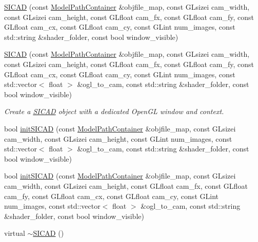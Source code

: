 \begin{DoxyCompactItemize}
\item 
\mbox{\hyperlink{classSICAD_a1d217cbdc1670f8c5885c413e4acbede}{S\+I\+C\+AD}} (const \mbox{\hyperlink{classSICAD_a9e1e1460d4c0f331b4fd015aae4dd721}{Model\+Path\+Container}} \&objfile\+\_\+map, const G\+Lsizei cam\+\_\+width, const G\+Lsizei cam\+\_\+height, const G\+Lfloat cam\+\_\+fx, const G\+Lfloat cam\+\_\+fy, const G\+Lfloat cam\+\_\+cx, const G\+Lfloat cam\+\_\+cy, const G\+Lint num\+\_\+images, const std\+::string \&shader\+\_\+folder, const bool window\+\_\+visible)
\item 
\mbox{\hyperlink{classSICAD_ac4e6349b361e3ec41d828e0d0f77f12b}{S\+I\+C\+AD}} (const \mbox{\hyperlink{classSICAD_a9e1e1460d4c0f331b4fd015aae4dd721}{Model\+Path\+Container}} \&objfile\+\_\+map, const G\+Lsizei cam\+\_\+width, const G\+Lsizei cam\+\_\+height, const G\+Lfloat cam\+\_\+fx, const G\+Lfloat cam\+\_\+fy, const G\+Lfloat cam\+\_\+cx, const G\+Lfloat cam\+\_\+cy, const G\+Lint num\+\_\+images, const std\+::vector$<$ float $>$ \&ogl\+\_\+to\+\_\+cam, const std\+::string \&shader\+\_\+folder, const bool window\+\_\+visible)
\begin{DoxyCompactList}\small\item\em Create a \mbox{\hyperlink{classSICAD}{S\+I\+C\+AD}} object with a dedicated Open\+GL window and context. \end{DoxyCompactList}\item 
bool \mbox{\hyperlink{classSICAD_a04e1291dc1a51b2dee87dbe9a5b3a316}{init\+S\+I\+C\+AD}} (const \mbox{\hyperlink{classSICAD_a9e1e1460d4c0f331b4fd015aae4dd721}{Model\+Path\+Container}} \&objfile\+\_\+map, const G\+Lsizei cam\+\_\+width, const G\+Lsizei cam\+\_\+height, const G\+Lint num\+\_\+images, const std\+::vector$<$ float $>$ \&ogl\+\_\+to\+\_\+cam, const std\+::string \&shader\+\_\+folder, const bool window\+\_\+visible)
\item 
bool \mbox{\hyperlink{classSICAD_abb2b0250a885435828d5255645e06ac8}{init\+S\+I\+C\+AD}} (const \mbox{\hyperlink{classSICAD_a9e1e1460d4c0f331b4fd015aae4dd721}{Model\+Path\+Container}} \&objfile\+\_\+map, const G\+Lsizei cam\+\_\+width, const G\+Lsizei cam\+\_\+height, const G\+Lfloat cam\+\_\+fx, const G\+Lfloat cam\+\_\+fy, const G\+Lfloat cam\+\_\+cx, const G\+Lfloat cam\+\_\+cy, const G\+Lint num\+\_\+images, const std\+::vector$<$ float $>$ \&ogl\+\_\+to\+\_\+cam, const std\+::string \&shader\+\_\+folder, const bool window\+\_\+visible)
\item 
virtual \mbox{\hyperlink{classSICAD_a4e3d6d1f90ea2261dcd8507ee8709360}{$\sim$\+S\+I\+C\+AD}} ()

\end{DoxyCompactItemize}
